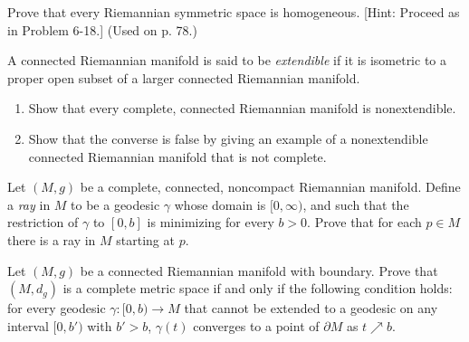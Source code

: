 \begin{exercise}
\label{prob:symmetric-space-homogeneous}

Prove that every Riemannian symmetric space is homogeneous. [Hint: Proceed as in Problem 6-18.] (Used on p. 78.)
\end{exercise}

\begin{exercise}
\label{prob:extendible}

A connected Riemannian manifold is said to be \emph{extendible} if it is isometric to a proper open subset of a larger connected Riemannian manifold.
\begin{enumerate}
\item[(a)] Show that every complete, connected Riemannian manifold is nonextendible.
\item[(b)] Show that the converse is false by giving an example of a nonextendible connected Riemannian manifold that is not complete.
\end{enumerate}
\end{exercise}

\begin{exercise}
\label{prob:ray-definition}

Let $(M,g)$ be a complete, connected, noncompact Riemannian manifold. Define a \emph{ray} in $M$ to be a geodesic $\gamma$ whose domain is $[0,\infty)$, and such that the restriction of $\gamma$ to $[0,b]$ is minimizing for every $b > 0$. Prove that for each $p \in M$ there is a ray in $M$ starting at $p$.
\end{exercise}

\begin{exercise}
\label{prob:manifold-boundary-complete}

Let $(M,g)$ be a connected Riemannian manifold with boundary. Prove that $(M, d_g)$ is a complete metric space if and only if the following condition holds: for every geodesic $\gamma: [0,b) \to M$ that cannot be extended to a geodesic on any interval $[0,b')$ with $b' > b$, $\gamma(t)$ converges to a point of $\partial M$ as $t \nearrow b$.
\end{exercise}

